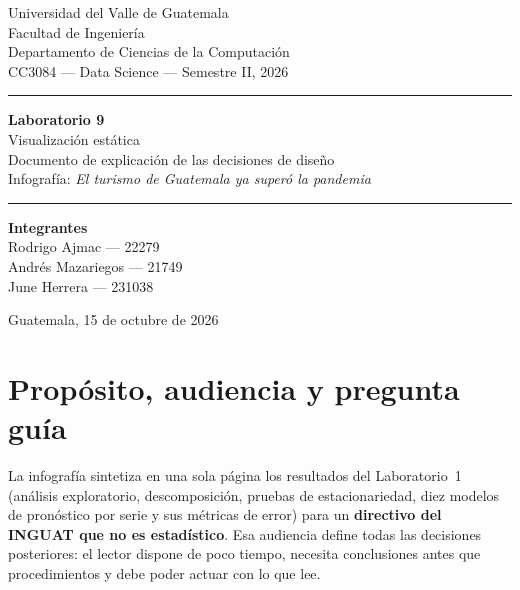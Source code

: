 \documentclass[12pt,letterpaper]{article}
\begin{document}
\begin{titlepage}
\centering
\vspace*{1.2cm}
{\large Universidad del Valle de Guatemala}\\[0.2em]
{\large Facultad de Ingeniería}\\[0.2em]
{\large Departamento de Ciencias de la Computación}\\[0.2em]
{\large CC3084 --- Data Science --- Semestre II, 2026}

\vspace{3cm}
\rule{\textwidth}{1.2pt}
\vspace{0.7cm}

{\Huge\bfseries Laboratorio 9}\\[0.6em]
{\LARGE Visualización estática}\\[0.9em]
{\large Documento de explicación de las decisiones de diseño}\\[0.3em]
{\large Infografía: \textit{El turismo de Guatemala ya superó la pandemia}}

\vspace{0.7cm}
\rule{\textwidth}{1.2pt}

\vspace{2.4cm}
{\large\bfseries Integrantes}\\[0.8em]
{\large Rodrigo Ajmac --- 22279}\\[0.3em]
{\large Andrés Mazariegos --- 21749}\\[0.3em]
{\large June Herrera --- 231038}

\vfill
{\large Guatemala, 15 de octubre de 2026}
\end{titlepage}

\tableofcontents
\newpage

\section{Propósito, audiencia y pregunta guía}

La infografía sintetiza en una sola página los resultados del Laboratorio~1 (análisis
exploratorio, descomposición, pruebas de estacionariedad, diez modelos de pronóstico por serie y
sus métricas de error) para un \textbf{directivo del INGUAT que no es estadístico}. Esa audiencia
define todas las decisiones posteriores: el lector dispone de poco tiempo, necesita conclusiones
antes que procedimientos y debe poder actuar con lo que lee.
\end{document}
